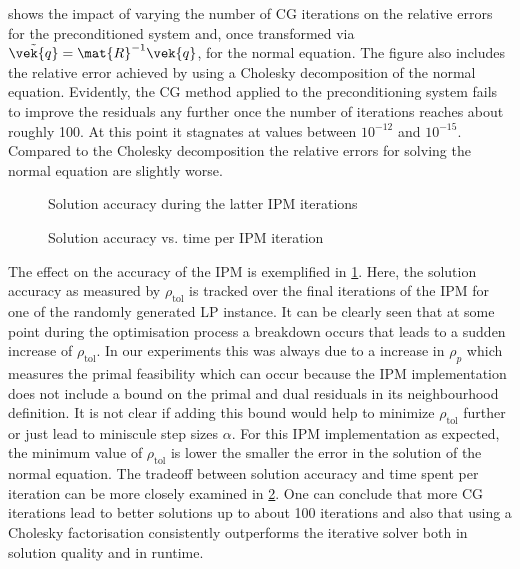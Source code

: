 shows the impact of varying the number of CG iterations on the relative errors for the preconditioned system and, once transformed via \(\tilde{\vek{q}} = \mat{R}^{-1}\vek{q}\), for the normal equation.
The figure also includes the relative error achieved by using a Cholesky decomposition of the normal equation.
Evidently, the CG method applied to the preconditioning system fails to improve the residuals any further once the number of iterations reaches about roughly 100.
At this point it stagnates at values between \(10^{-12}\) and \(10^{-15}\).
Compared to the Cholesky decomposition the relative errors for solving the normal equation are slightly worse.

\begin{figure}[tbp]
  \centering%
  \caption{Solution accuracy during the latter IPM iterations}%
  \label{fig:accuracy_history}
\end{figure}

\begin{figure}[tbp]
  \centering%
  \caption{Solution accuracy vs. time per IPM iteration}%
  \label{fig:accuracy_vs_time}
\end{figure}

The effect on the accuracy of the IPM is exemplified in \cref{fig:accuracy_history}.
Here, the solution accuracy as measured by \(\rho_{\mathrm{tol}}\) is tracked over the final iterations of the IPM for one of the randomly generated LP instance.
It can be clearly seen that at some point during the optimisation process a breakdown occurs that leads to a sudden increase of \(\rho_{\mathrm{tol}}\).
In our experiments this was always due to a increase in \(\rho_p\) which measures the primal feasibility which can occur because the IPM implementation does not include a bound on the primal and dual residuals in its neighbourhood definition. 
It is not clear if adding this bound would help to minimize \(\rho_{\mathrm{tol}}\) further or just lead to miniscule step sizes \(\alpha\).
For this IPM implementation as expected, the minimum value of \(\rho_{\mathrm{tol}}\) is lower the smaller the error in the solution of the normal equation.
The tradeoff between solution accuracy and time spent per iteration can be more closely examined in \cref{fig:accuracy_vs_time}.
One can conclude that more CG iterations lead to better solutions up to about 100 iterations and also that using a Cholesky factorisation consistently outperforms the iterative solver both in solution quality and in runtime.

